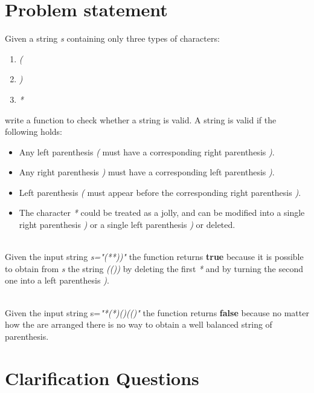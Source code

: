 \section{Problem statement}
\begin{exercise}
 Given a string \textit{s} containing only three types of characters:
 \begin{enumerate}
	 \item \textit{(}
	 \item \textit{)}
	 \item \textit{*}
 \end{enumerate}
 write a function to check whether a string is valid. A string is valid if the following  holds:

  \begin{itemize}
	\item  Any left parenthesis \textit{(} must have a corresponding  right parenthesis \textit{)}.
    \item Any right parenthesis \textit{)}  must have a corresponding left parenthesis \textit{)}.
    \item Left parenthesis \textit{(} must appear before the corresponding right parenthesis \textit{)}.
    \item The character \textit{*} could be treated as a jolly, and can be modified into a single right parenthesis  \textit{)} or a single left parenthesis \textit{)} or deleted.
 \end{itemize}  


	\begin{example}
		\hfill \\
		Given the input string \textit{s="(**))"} the function returns \textbf{true} because it is possible to obtain from \textit{s} the string \textit{(())} by deleting the first \textit{*} and by turning the second one into a left parenthesis \textit{)}.
	\end{example}

	\begin{example}
		\hfill \\
		Given the input string s=\textit{"*(*)()(()"} the function returns \textbf{false} because no matter how the 	\inline{*} are arranged there is no way to obtain a well balanced string of parenthesis.
	\end{example}
\end{exercise}

\section{Clarification Questions}

